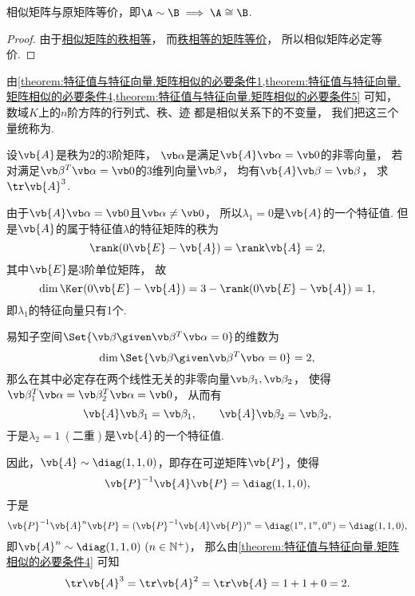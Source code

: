 \begin{property}
相似矩阵与原矩阵等价，即\(\A\sim\B \implies \A\cong\B\).
\begin{proof}
由于\hyperref[theorem:特征值与特征向量.矩阵相似的必要条件5]{相似矩阵的秩相等}，
而\hyperref[theorem:矩阵乘积的秩.矩阵等价的充分必要条件]{秩相等的矩阵等价}，
所以相似矩阵必定等价.
\end{proof}
\end{property}

\begin{remark}
由\cref{theorem:特征值与特征向量.矩阵相似的必要条件1,theorem:特征值与特征向量.矩阵相似的必要条件4,theorem:特征值与特征向量.矩阵相似的必要条件5} 可知，
数域\(K\)上的\(n\)阶方阵的行列式、秩、迹
都是相似关系下的不变量，
我们把这三个量统称为.
\end{remark}

\begin{example}
设\(\vb{A}\)是秩为2的3阶矩阵，
\(\vb\alpha\)是满足\(\vb{A} \vb\alpha = \vb0\)的非零向量，
若对满足\(\vb\beta^T \vb\alpha = \vb0\)的3维列向量\(\vb\beta\)，
均有\(\vb{A} \vb\beta = \vb\beta\)，
求\(\tr\vb{A}^3\).
\begin{solution}
由于\(\vb{A} \vb\alpha = \vb0\)且\(\vb\alpha \neq \vb0\)，
所以\(\lambda_1 = 0\)是\(\vb{A}\)的一个特征值.
但是\(\vb{A}\)的属于特征值\(\lambda\)的特征矩阵的秩为\[
	\rank(0\vb{E}-\vb{A})
	= \rank\vb{A}
	= 2,
\]
其中\(\vb{E}\)是3阶单位矩阵，
故\[
	\dim\Ker(0\vb{E}-\vb{A})
	= 3 - \rank(0\vb{E}-\vb{A})
	= 1,
\]
即\(\lambda_1\)的特征向量只有1个.

易知子空间\(\Set{\vb\beta \given \vb\beta^T \vb\alpha = 0}\)的维数为\[
	\dim\Set{\vb\beta \given \vb\beta^T \vb\alpha = 0} = 2,
\]
那么在其中必定存在两个线性无关的非零向量\(\vb\beta_1,\vb\beta_2\)，
使得\(\vb\beta_1^T \vb\alpha
= \vb\beta_2^T \vb\alpha
= \vb0\)，
从而有\[
	\vb{A}\vb\beta_1 = \vb\beta_1,
	\qquad
	\vb{A}\vb\beta_2 = \vb\beta_2,
\]
于是\(\lambda_2 = 1\ (\text{二重})\)是\(\vb{A}\)的一个特征值.

因此，\(\vb{A} \sim \diag(1,1,0)\)，即存在可逆矩阵\(\vb{P}\)，使得\[
	\vb{P}^{-1} \vb{A} \vb{P}
	= \diag(1,1,0),
\]
于是\[
	\vb{P}^{-1} \vb{A}^n \vb{P}
	= (\vb{P}^{-1} \vb{A} \vb{P})^n
	= \diag(1^n,1^n,0^n)
	= \diag(1,1,0),
\]
即\(\vb{A}^n \sim \diag(1,1,0)\ (n\in\mathbb{N}^+)\)，
那么由\cref{theorem:特征值与特征向量.矩阵相似的必要条件4}
可知\[
	\tr\vb{A}^3
	= \tr\vb{A}^2
	= \tr\vb{A}
	= 1+1+0
	= 2.
\]
\end{solution}
\end{example}

